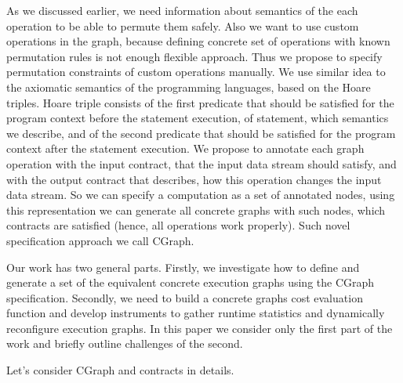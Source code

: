 As we discussed earlier, we need information about semantics of the each operation to be able to permute them safely.
Also we want to use custom operations in the graph, because defining concrete set of operations with known permutation rules is not enough flexible approach.
Thus we propose to specify permutation constraints of custom operations manually.
We use similar idea to the axiomatic semantics of the programming languages, based on the Hoare triples.
Hoare triple consists of the first predicate that should be satisfied for the program context before the statement execution, of statement, which semantics we describe, and of the second predicate that should be satisfied for the program context after the statement execution.
We propose to annotate each graph operation with the input contract, that the input data stream should satisfy, and with the output contract that describes, how this operation changes the input data stream.
So we can specify a computation as a set of annotated nodes, using this representation we can generate all concrete graphs with such nodes, which contracts are satisfied (hence, all operations work properly).
Such novel specification approach we call CGraph.

Our work has two general parts.
Firstly, we investigate how to define and generate a set of the equivalent concrete execution graphs using the CGraph specification.
Secondly, we need to build a concrete graphs cost evaluation function and develop instruments to gather runtime statistics and dynamically reconfigure execution graphs.
In this paper we consider only the first part of the work and briefly outline challenges of the second.

Let's consider CGraph and contracts in details.
